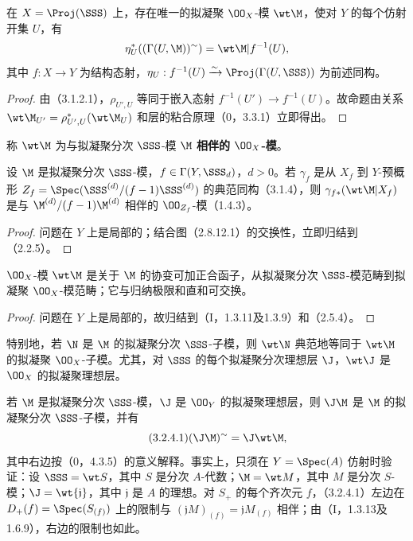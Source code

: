 在 $X=\Proj(\SSS)$ 上，存在唯一的拟凝聚 $\OO_X$-模 $\wt\M$，使对 $Y$ 的每个仿射开集 $U$，有
\[
\eta_U^*((\Gamma(U,\M))^\sim)=\wt\M|f^{-1}(U),
\]
其中 $f:X\to Y$ 为结构态射，$\eta_U:f^{-1}(U)\xrightarrow{\sim}\Proj(\Gamma(U,\SSS))$ 为前述同构。
\begin{proof}
由（3.1.2.1），$\rho_{U',U}$ 等同于嵌入态射 $f^{-1}(U')\to f^{-1}(U)$。故命题由关系
$\wt\M_{U'}=\rho_{U',U}^*(\wt\M_U)$ 和层的粘合原理（0，3.3.1）立即得出。
\end{proof}
称 $\wt\M$ 为与拟凝聚分次 $\SSS$-模 $\M$ \textbf{相伴的 $\OO_X$-模}。

设 $\M$ 是拟凝聚分次 $\SSS$-模，$f\in\Gamma(Y,\SSS_d)$，$d>0$。若 $\gamma_f$ 是从 $X_f$ 到 $Y$-预概形
$Z_f=\Spec(\SSS^{(d)}/(f-1)\SSS^{(d)})$ 的典范同构（3.1.4），则
$\gamma_{f*}(\wt\M|X_f)$ 是与
$\M^{(d)}/(f-1)\M^{(d)}$ 相伴的 $\OO_{Z_f}$-模（1.4.3）。
\begin{proof}
问题在 $Y$ 上是局部的；结合图（2.8.12.1）的交换性，立即归结到（2.2.5）。
\end{proof}

$\OO_X$-模 $\wt\M$ 是关于 $\M$ 的协变可加正合函子，从拟凝聚分次 $\SSS$-模范畴到拟凝聚 $\OO_X$-模范畴；它与归纳极限和直和可交换。
\begin{proof}
问题在 $Y$ 上是局部的，故归结到（I，1.3.11及1.3.9）和（2.5.4）。
\end{proof}
特别地，若 $\N$ 是 $\M$ 的拟凝聚分次 $\SSS$-子模，则 $\wt\N$ 典范地等同于 $\wt\M$ 的拟凝聚 $\OO_X$-子模。尤其，对 $\SSS$ 的每个拟凝聚分次理想层 $\J$，$\wt\J$ 是 $\OO_X$ 的拟凝聚理想层。

若 $\M$ 是拟凝聚分次 $\SSS$-模，$\J$ 是 $\OO_Y$ 的拟凝聚理想层，则 $\J\M$ 是 $\M$ 的拟凝聚分次 $\SSS$-子模，并有
\begin{equation}\tag{3.2.4.1}(\J\M)^\sim=\J\wt\M,\end{equation}
其中右边按（0，4.3.5）的意义解释。事实上，只须在 $Y=\Spec(A)$ 仿射时验证：设 $\SSS=\wt S$，其中 $S$ 是分次 $A$-代数；$\M=\wt M$，其中 $M$ 是分次 $S$-模；$\J=\wt{\mathfrak j}$，其中 $\mathfrak j$ 是 $A$ 的理想。对 $S_+$ 的每个齐次元 $f$，（3.2.4.1）左边在 $D_+(f)=\Spec(S_{(f)})$ 上的限制与
$(\mathfrak jM)_{(f)}=\mathfrak jM_{(f)}$ 相伴；由（I，1.3.13及1.6.9），右边的限制也如此。

